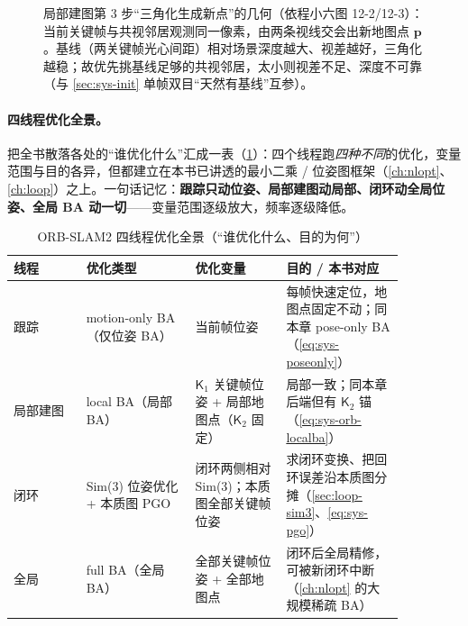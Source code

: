 \begin{figure}[ht]
\centering
{}
\caption{局部建图第 $3$ 步“三角化生成新点”的几何（依程小六图 12-2/12-3）：当前关键帧与共视邻居观测同一像素，由两条视线交会出新地图点 $\mathbf{p}$。基线（两关键帧光心间距）相对场景深度越大、视差越好，三角化越稳；故优先挑基线足够的共视邻居，太小则视差不足、深度不可靠（与 \cref{sec:sys-init} 单帧双目“天然有基线”互参）。}
\label{fig:sys-localmap-tri}
\end{figure}

\paragraph{四线程优化全景。}
把全书散落各处的“谁优化什么”汇成一表（\cref{tab:sys-four-opt}）：四个线程跑\emph{四种不同}的优化，变量范围与目的各异，但都建立在本书已讲透的最小二乘 / 位姿图框架（\cref{ch:nlopt}、\cref{ch:loop}）之上。一句话记忆：\textbf{跟踪只动位姿、局部建图动局部、闭环动全局位姿、全局 BA 动一切}——变量范围逐级放大，频率逐级降低。

\begin{table}[H]\centering\small
\caption{ORB-SLAM2 四线程优化全景（“谁优化什么、目的为何”）}
\label{tab:sys-four-opt}
\begin{tabular}{p{0.16\linewidth}p{0.24\linewidth}p{0.20\linewidth}p{0.26\linewidth}}
\toprule
线程 & 优化类型 & 优化变量 & 目的 / 本书对应 \\
\midrule
跟踪 & motion-only BA（仅位姿 BA） & 当前帧位姿 & 每帧快速定位，地图点固定不动；同本章 pose-only BA（\cref{eq:sys-poseonly}） \\
局部建图 & local BA（局部 BA） & $\mathsf{K}_1$ 关键帧位姿 + 局部地图点（$\mathsf{K}_2$ 固定） & 局部一致；同本章后端但有 $\mathsf{K}_2$ 锚（\cref{eq:sys-orb-localba}） \\
闭环 & Sim(3) 位姿优化 + 本质图 PGO & 闭环两侧相对 Sim(3)；本质图全部关键帧位姿 & 求闭环变换、把回环误差沿本质图分摊（\cref{sec:loop-sim3}、\cref{eq:sys-pgo}） \\
全局 & full BA（全局 BA） & 全部关键帧位姿 + 全部地图点 & 闭环后全局精修，可被新闭环中断（\cref{ch:nlopt} 的大规模稀疏 BA） \\
\bottomrule
\end{tabular}
\end{table}

